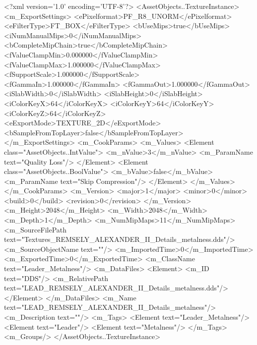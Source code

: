 <?xml version='1.0' encoding='UTF-8'?>
<AssetObjects..TextureInstance>
  <m_ExportSettings>
    <ePixelformat>PF_R8_UNORM</ePixelformat>
    <eFilterType>FT_BOX</eFilterType>
    <bUseMips>true</bUseMips>
    <iNumManualMips>0</iNumManualMips>
    <bCompleteMipChain>true</bCompleteMipChain>
    <fValueClampMin>0.000000</fValueClampMin>
    <fValueClampMax>1.000000</fValueClampMax>
    <fSupportScale>1.000000</fSupportScale>
    <fGammaIn>1.000000</fGammaIn>
    <fGammaOut>1.000000</fGammaOut>
    <iSlabWidth>0</iSlabWidth>
    <iSlabHeight>0</iSlabHeight>
    <iColorKeyX>64</iColorKeyX>
    <iColorKeyY>64</iColorKeyY>
    <iColorKeyZ>64</iColorKeyZ>
    <eExportMode>TEXTURE_2D</eExportMode>
    <bSampleFromTopLayer>false</bSampleFromTopLayer>
  </m_ExportSettings>
  <m_CookParams>
    <m_Values>
      <Element class="AssetObjects..IntValue">
        <m_nValue>3</m_nValue>
        <m_ParamName text="Quality Loss"/>
      </Element>
      <Element class="AssetObjects..BoolValue">
        <m_bValue>false</m_bValue>
        <m_ParamName text="Skip Compression"/>
      </Element>
    </m_Values>
  </m_CookParams>
  <m_Version>
    <major>1</major>
    <minor>0</minor>
    <build>0</build>
    <revision>0</revision>
  </m_Version>
  <m_Height>2048</m_Height>
  <m_Width>2048</m_Width>
  <m_Depth>1</m_Depth>
  <m_NumMipMaps>11</m_NumMipMaps>
  <m_SourceFilePath text="Textures\LEAD_REMSELY_ALEXANDER_II_Details_metalness.dds"/>
  <m_SourceObjectName text=""/>
  <m_ImportedTime>0</m_ImportedTime>
  <m_ExportedTime>0</m_ExportedTime>
  <m_ClassName text="Leader_Metalness"/>
  <m_DataFiles>
    <Element>
      <m_ID text="DDS"/>
      <m_RelativePath text="LEAD_REMSELY_ALEXANDER_II_Details_metalness.dds"/>
    </Element>
  </m_DataFiles>
  <m_Name text="LEAD_REMSELY_ALEXANDER_II_Details_metalness"/>
  <m_Description text=""/>
  <m_Tags>
    <Element text="Leader_Metalness"/>
    <Element text="Leader"/>
    <Element text="Metalness"/>
  </m_Tags>
  <m_Groups/>
</AssetObjects..TextureInstance>
